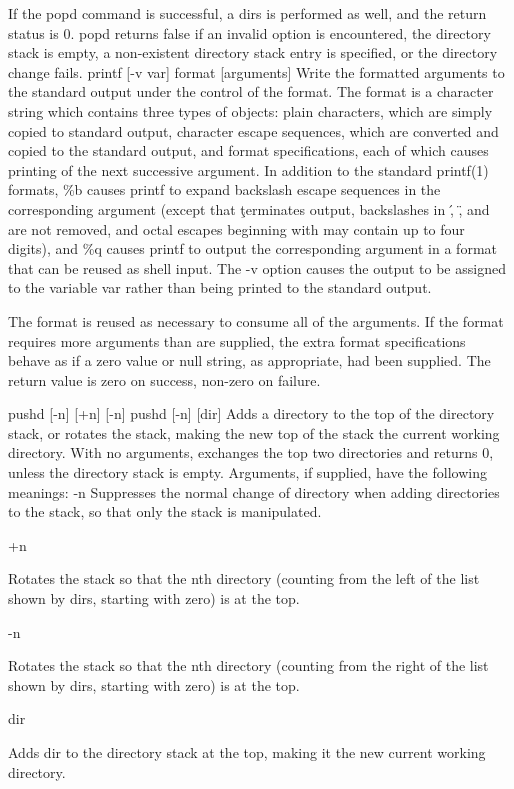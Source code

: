 {{If the popd command is successful, a dirs is performed as well, and the return status is 0. popd returns false if an invalid option is encountered, the directory stack is empty, a non-existent directory stack entry is specified, or the directory change fails.
printf [-v var] format [arguments]
Write the formatted arguments to the standard output under the control of the format. The format is a character string which contains three types of objects: plain characters, which are simply copied to standard output, character escape sequences, which are converted and copied to the standard output, and format specifications, each of which causes printing of the next successive argument. In addition to the standard printf(1) formats, \%b causes printf to expand backslash escape sequences in the corresponding argument (except that \c terminates output, backslashes in \', \", and \? are not removed, and octal escapes beginning with \0 may contain up to four digits), and \%q causes printf to output the corresponding argument in a format that can be reused as shell input.
The -v option causes the output to be assigned to the variable var rather than being printed to the standard output.

The format is reused as necessary to consume all of the arguments. If the format requires more arguments than are supplied, the extra format specifications behave as if a zero value or null string, as appropriate, had been supplied. The return value is zero on success, non-zero on failure.

pushd [-n] [+n] [-n]
pushd [-n] [dir]
Adds a directory to the top of the directory stack, or rotates the stack, making the new top of the stack the current working directory. With no arguments, exchanges the top two directories and returns 0, unless the directory stack is empty. Arguments, if supplied, have the following meanings:
-n
Suppresses the normal change of directory when adding directories to the stack, so that only the stack is manipulated.

+n

Rotates the stack so that the nth directory (counting from the left of the list shown by dirs, starting with zero) is at the top.

-n

Rotates the stack so that the nth directory (counting from the right of the list shown by dirs, starting with zero) is at the top.

dir

Adds dir to the directory stack at the top, making it the new current working directory.

}}
